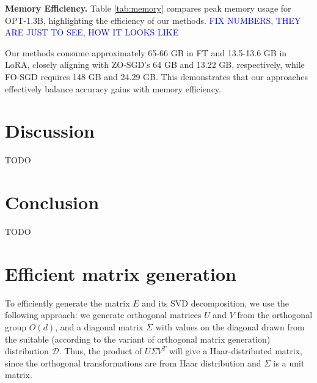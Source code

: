 \documentclass{article}
\theoremstyle{plain}
\theoremstyle{definition}
\theoremstyle{remark}
\begin{document}
\textbf{Memory Efficiency.} Table \ref{tab:memory} compares peak memory usage for OPT-1.3B, highlighting the efficiency of our methods.
\textcolor{blue}{FIX NUMBERS, THEY ARE JUST TO SEE, HOW IT LOOKS LIKE}
\begin{table}[H]
    \centering
    \caption{Peak memory usage (GB) for OPT-1.3B on SST2 with FT and LoRA.}
    \label{tab:memory}
\end{table}

Our methods consume approximately 65-66 GB in FT and 13.5-13.6 GB in LoRA, closely aligning with ZO-SGD's 64 GB and 13.22 GB, respectively, while FO-SGD requires 148 GB and 24.29 GB. This demonstrates that our approaches effectively balance accuracy gains with memory efficiency.

\section{Discussion}\label{sec:disc}
TODO

\section{Conclusion}\label{sec:concl}

TODO




\appendix

\section{Efficient matrix generation} \label{subsec:mezo_generation}

To efficiently generate the matrix $E$ and its SVD decomposition, we use the following approach: we generate orthogonal matrices $U$ and $V$ from the orthogonal group $O(d)$, and a diagonal matrix $\Sigma$ with values on the diagonal drawn from the suitable (according to the variant of orthogonal matrix generation) distribution $\mathcal{D}$. Thus, the product of $U\Sigma V^T$ will give a Haar-distributed matrix, since the orthogonal transformations are from Haar distribution and $\Sigma$ is a unit matrix. 
\end{document}
